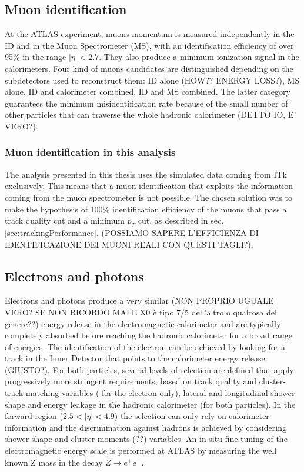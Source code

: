 \documentclass[a4paper,twoside,12pt]{article}
\begin{document}
\subsection{Muon identification}
At the ATLAS experiment, muons momentum is measured independently in the ID and in the
Muon Spectrometer (MS), with an identification efficiency of over 95\%\cite{PhysicsObjectReconstruction} in the
range $|\eta| < 2.7$. They also produce a minimum ionization signal in the calorimeters. Four kind of muons candidates are distinguished depending on the 
subdetectors used to reconstruct them: ID alone (HOW?? ENERGY LOSS?), MS alone, ID and calorimeter combined, ID
and MS combined. The latter category guarantees the minimum misidentification rate
because of the small number of other particles that can traverse the whole hadronic calorimeter (DETTO IO, E' VERO?). 

\subsubsection*{Muon identification in this analysis}
The analysis presented in this thesis uses the simulated data coming from ITk exclusively.
This means that a muon identification that exploits the information coming from the muon spectrometer is not possible. The chosen solution was to make the hypothesis of 100\% identification efficiency of the muons that pass a track quality cut and a minimum $p_{T}$ cut, as described in sec.\ref{sec:trackingPerformance}. (POSSIAMO SAPERE L'EFFICIENZA DI IDENTIFICAZIONE DEI MUONI REALI CON QUESTI TAGLI?). 

\subsection{Electrons and photons}
Electrons and photons produce a very similar (NON PROPRIO UGUALE VERO? SE NON RICORDO MALE X0 è tipo 7/5 dell'altro o qualcosa del genere??) energy release in the electromagnetic calorimeter and are typically completely absorbed before reaching the hadronic calorimeter for a broad range of energies. The identification of the
electron can be achieved by 
looking for a track in the Inner Detector that points to the calorimeter energy release.(GIUSTO?). For both particles, several levels of selection are defined that apply progressively
more stringent requirements, based on track quality and cluster-track matching variables (
for the electron only), lateral and longitudinal shower shape and energy leakage in the 
hadronic calorimeter (for both particles). In the forward region ($2.5 < |\eta| < 4.9$) the 
selection can only rely on calorimeter information and the discrimination against hadrons
is achieved by considering shower shape and cluster moments (??) variables. An in-situ fine tuning
of the electromagnetic energy scale is performed at ATLAS by measuring the well known 
Z mass in the decay $Z \rightarrow e^+e^-$.
\end{document}
